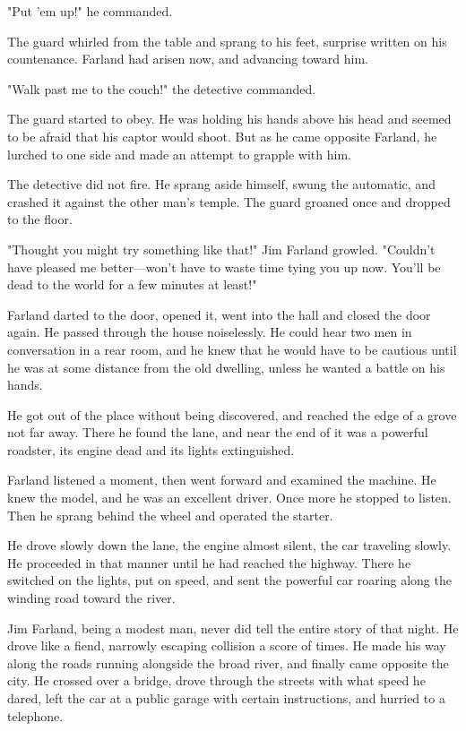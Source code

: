 \documentclass{novel}
\begin{document}
"Put 'em up!" he commanded.

The guard whirled from the table and sprang to his feet, surprise written on his countenance. Farland had arisen now, and advancing toward him.

"Walk past me to the couch!" the detective commanded.

The guard started to obey. He was holding his hands above his head and seemed to be afraid that his captor would shoot. But as he came opposite Farland, he lurched to one side and made an attempt to grapple with him.

The detective did not fire. He sprang aside himself, swung the automatic, and crashed it against the other man's temple. The guard groaned once and dropped to the floor.

"Thought you might try something like that!" Jim Farland growled. "Couldn't have pleased me better---won't have to waste time tying you up now. You'll be dead to the world for a few minutes at least!"

Farland darted to the door, opened it, went into the hall and closed the door again. He passed through the house noiselessly. He could hear two men in conversation in a rear room, and he knew that he would have to be cautious until he was at some distance from the old dwelling, unless he wanted a battle on his hands.

He got out of the place without being discovered, and reached the edge of a grove not far away. There he found the lane, and near the end of it was a powerful roadster, its engine dead and its lights extinguished.

Farland listened a moment, then went forward and examined the machine. He knew the model, and he was an excellent driver. Once more he stopped to listen. Then he sprang behind the wheel and operated the starter.

He drove slowly down the lane, the engine almost silent, the car traveling slowly. He proceeded in that manner until he had reached the highway. There he switched on the lights, put on speed, and sent the powerful car roaring along the winding road toward the river.

Jim Farland, being a modest man, never did tell the entire story of that night. He drove like a fiend, narrowly escaping collision a score of times. He made his way along the roads running alongside the broad river, and finally came opposite the city. He crossed over a bridge, drove through the streets with what speed he dared, left the car at a public garage with certain instructions, and hurried to a telephone.
\end{document}
